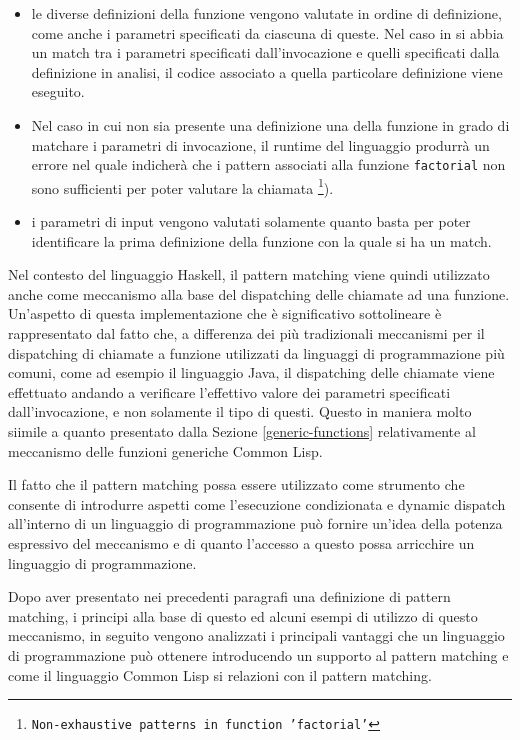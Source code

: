 \begin{itemize}

\item le diverse definizioni della funzione vengono valutate in ordine di
definizione, come anche i parametri specificati da ciascuna di queste. Nel caso
in si abbia un match tra i parametri specificati dall'invocazione e quelli
specificati dalla definizione in analisi, il codice associato a quella
particolare definizione viene eseguito.

\item Nel caso in cui non sia presente una definizione una della funzione in
grado di matchare i parametri di invocazione, il runtime del linguaggio produrrà
un errore nel quale indicherà che i pattern associati alla funzione
\texttt{factorial} non sono sufficienti per poter valutare la chiamata
\footnote{\texttt{Non-exhaustive patterns in function 'factorial'}}).

\item i parametri di input vengono valutati solamente quanto basta per poter
identificare la prima definizione della funzione con la quale si ha un match.

\end{itemize}

Nel contesto del linguaggio Haskell, il pattern matching viene quindi utilizzato
anche come meccanismo alla base del dispatching delle chiamate ad una funzione.
Un’aspetto di questa implementazione che è significativo sottolineare è
rappresentato dal fatto che, a differenza dei più tradizionali meccanismi per il
dispatching di chiamate a funzione utilizzati da linguaggi di programmazione più
comuni, come ad esempio il linguaggio Java, il dispatching delle chiamate viene
effettuato andando a verificare l’effettivo valore dei parametri specificati
dall’invocazione, e non solamente il tipo di questi. Questo in maniera molto
siimile a quanto presentato dalla Sezione \ref{generic-functions} relativamente
al meccanismo delle funzioni generiche Common Lisp.

Il fatto che il pattern matching possa essere utilizzato come strumento che
consente di introdurre aspetti come l’esecuzione condizionata e dynamic dispatch
all’interno di un linguaggio di programmazione può fornire un’idea della potenza
espressivo del meccanismo e di quanto l'accesso a questo possa arricchire un
linguaggio di programmazione.

Dopo aver presentato nei precedenti paragrafi una definizione di pattern
matching, i principi alla base di questo ed alcuni esempi di utilizzo di questo
meccanismo, in seguito vengono analizzati i principali vantaggi che un
linguaggio di programmazione può ottenere introducendo un supporto al pattern
matching e come il linguaggio Common Lisp si relazioni con il pattern
matching.

